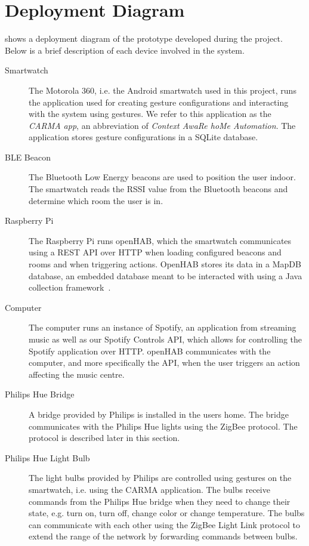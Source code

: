\section{Deployment Diagram}

 shows a deployment diagram of the prototype developed during the project. Below is a brief description of each device involved in the system.

\begin{description}
\item[Smartwatch] The Motorola 360, i.e. the Android smartwatch used in this project, runs the application used for creating gesture configurations and interacting with the system using gestures. We refer to this application as the \emph{CARMA app}, an abbreviation of \emph{Context AwaRe hoMe Automation}. The application stores gesture configurations in a SQLite database.
\item[BLE Beacon] The Bluetooth Low Energy beacons are used to position the user indoor. The smartwatch reads the RSSI value from the Bluetooth beacons and determine which room the user is in.
\item[Raspberry Pi] The Raspberry Pi runs openHAB, which the smartwatch communicates using a REST API over HTTP when loading configured beacons and rooms and when triggering actions. OpenHAB stores its data in a MapDB database, an embedded database meant to be interacted with using a Java collection framework~\cite{mapdb:mapdb}.
\item[Computer] The computer runs an instance of Spotify, an application from streaming music as well as our Spotify Controls API, which allows for controlling the Spotify application over HTTP. openHAB communicates with the computer, and more specifically the API, when the user triggers an action affecting the music centre.
\item[Philips Hue Bridge] A bridge provided by Philips is installed in the users home. The bridge communicates with the Philips Hue lights using the ZigBee protocol. The protocol is described later in this section.
\item[Philips Hue Light Bulb] The light bulbs provided by Philips are controlled using gestures on the smartwatch, i.e. using the CARMA application. The bulbs receive commands from the Philips Hue bridge when they need to change their state, e.g. turn on, turn off, change color or change temperature. The bulbs can communicate with each other using the ZigBee Light Link protocol to extend the range of the network by forwarding commands between bulbs.
\end{description}

